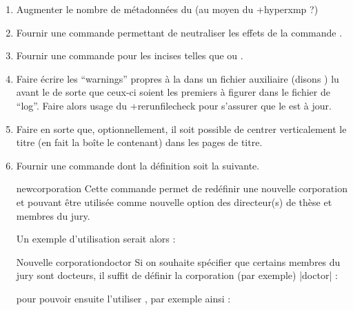 \begin{enumerate}
\item Augmenter le nombre de métadonnées du  (au moyen du
  \Package+{hyperxmp} ?)
\item Fournir une commande  permettant de
  neutraliser les effets de la commande .
\item Fournir une commande  pour les incises telles que
   ou .
\item Faire écrire les \foreignquote{english}{warnings} propres à la \yatCl{}
  dans un fichier auxiliaire (disons ) lu avant le  de
  sorte que ceux-ci soient les premiers à figurer dans le fichier de
  \foreignquote{english}{log}. Faire alors usage du \Package*+{rerunfilecheck}
  pour s'assurer que le  est à jour.
\item Faire en sorte que, optionnellement, il soit possible de centrer
  verticalement le titre (en fait la boîte le contenant) dans les pages de
  titre.
\item Fournir une commande  dont la définition soit la
  suivante.
\begin{docCommand}{newcorporation}{}
  Cette commande permet de redéfinir une nouvelle corporation 
  et  pouvant être utilisée comme nouvelle option des
  directeur(s) de thèse et membres du jury.
\end{docCommand}

Un exemple d'utilisation serait alors :
\begin{dbexample}{Nouvelle corporation}{doctor}
  Si on souhaite spécifier que certains membres du jury sont docteurs, il suffit
  de définir  la corporation (par exemple) |doctor| :
\begin{preamblecode}[title=Par exemple dans le \File{\configurationfile}]
\end{preamblecode}
  pour pouvoir ensuite l'utiliser , par
  exemple ainsi :
\begin{bodycode}
\end{bodycode}
\end{dbexample}

\end{enumerate}

